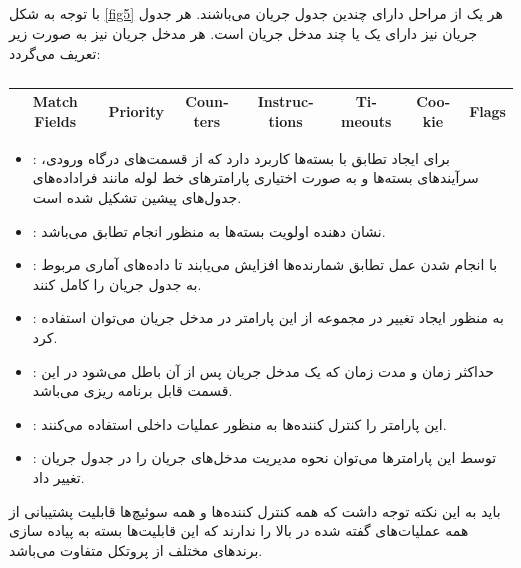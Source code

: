 \subsection{}
با توجه به شکل \ref{fig5} هر یک از مراحل  دارای چندین جدول جریان می‌باشند. هر جدول جریان نیز دارای یک یا چند مدخل جریان است. هر مدخل جریان نیز به صورت زیر تعریف می‌گردد:
\begin{table}[ht]
	\centering
	\begin{latin}
		\begin{tabular}[t]{|c|c|c|c|c|c|c|}
			\hline
			Match Fields & Priority & Counters & Instructions & Timeouts & Cookie & Flags\\
			\hline
		\end{tabular}
	\end{latin}
	\caption{}
	\label{tab1}
\end{table}

\begin{itemize}
	\item {}:
برای ایجاد تطابق با بسته‌ها کاربرد دارد که از قسمت‌های درگاه ورودی، سرآیند‌های بسته‌ها و به صورت اختیاری پارامتر‌های خط لوله مانند فراداده‌های جدول‌های پیشین تشکیل شده است.
	\item {}:
نشان دهنده اولویت بسته‌ها به منظور انجام تطابق می‌باشد.
	\item {}:
با انجام شدن عمل تطابق شمارنده‌ها افزایش می‌یابند تا داده‌های آماری مربوط به جدول جریان را کامل کنند.
	\item {}:
به منظور ایجاد تغییر در مجموعه  از این پارامتر در مدخل جریان می‌توان استفاده کرد.
	\item {}:
حداکثر زمان و مدت زمان  که یک مدخل جریان پس از آن باطل می‌شود در این قسمت قابل برنامه ریزی می‌باشد.
	\item {}:
این پارامتر را کنترل کننده‌ها به منظور عملیات داخلی استفاده می‌کنند.
	\item {}:
توسط این پارامتر‌ها می‌توان نحوه مدیریت مدخل‌های جریان را در جدول جریان تغییر داد.
\end{itemize}

باید به این نکته توجه داشت که همه کنترل کننده‌ها و همه سوئیچ‌ها قابلیت پشتیبانی از همه عملیات‌های گفته شده در بالا را ندارند که این قابلیت‌ها بسته به پیاده سازی برند‌های مختلف از پروتکل متفاوت می‌باشد.

